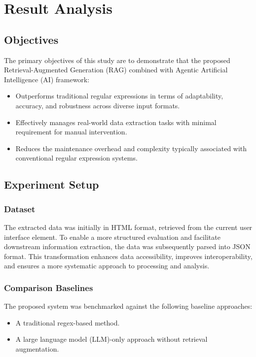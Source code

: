 \chapter{Result Analysis}


\section{Objectives}
The primary objectives of this study are to demonstrate that the proposed Retrieval-Augmented Generation (RAG) combined with Agentic Artificial Intelligence (AI) framework:

\begin{itemize}
    \item Outperforms traditional regular expressions in terms of adaptability, accuracy, and robustness across diverse input formats.
    \item Effectively manages real-world data extraction tasks with minimal requirement for manual intervention.
    \item Reduces the maintenance overhead and complexity typically associated with conventional regular expression systems.
\end{itemize}


\section{Experiment Setup}

\subsection{Dataset}
The extracted data was initially in HTML format, retrieved from the current user interface element. To enable a more structured evaluation and facilitate downstream information extraction, the data was subsequently parsed into JSON format. This transformation enhances data accessibility, improves interoperability, and ensures a more systematic approach to processing and analysis. 


\subsection{Comparison Baselines}
The proposed system was benchmarked against the following baseline approaches:
\begin{itemize}
    \item A traditional regex-based method.
    \item A large language model (LLM)-only approach without retrieval augmentation.
\end{itemize}

